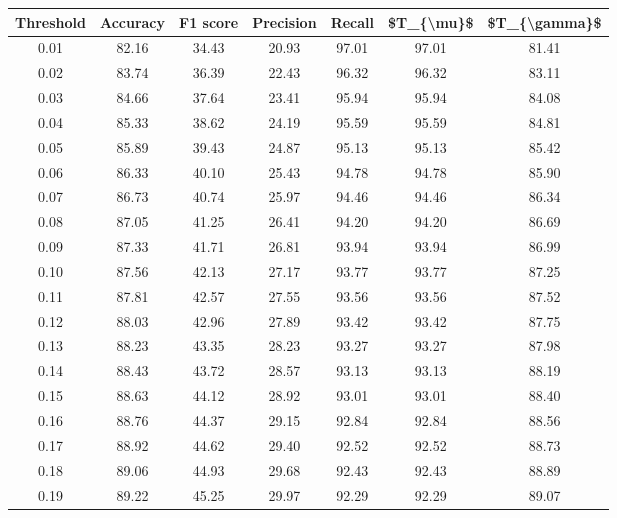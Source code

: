 \begin{tabular}{|c|c|c|c|c|c|c|}
\hline
 Threshold &  Accuracy &  F1 score &  Precision &  Recall &  \$T\_\{\textbackslash mu\}\$ &  \$T\_\{\textbackslash gamma\}\$ \\
\hline
      0.01 &     82.16 &     34.43 &      20.93 &   97.01 &      97.01 &         81.41 \\
      0.02 &     83.74 &     36.39 &      22.43 &   96.32 &      96.32 &         83.11 \\
      0.03 &     84.66 &     37.64 &      23.41 &   95.94 &      95.94 &         84.08 \\
      0.04 &     85.33 &     38.62 &      24.19 &   95.59 &      95.59 &         84.81 \\
      0.05 &     85.89 &     39.43 &      24.87 &   95.13 &      95.13 &         85.42 \\
      0.06 &     86.33 &     40.10 &      25.43 &   94.78 &      94.78 &         85.90 \\
      0.07 &     86.73 &     40.74 &      25.97 &   94.46 &      94.46 &         86.34 \\
      0.08 &     87.05 &     41.25 &      26.41 &   94.20 &      94.20 &         86.69 \\
      0.09 &     87.33 &     41.71 &      26.81 &   93.94 &      93.94 &         86.99 \\
      0.10 &     87.56 &     42.13 &      27.17 &   93.77 &      93.77 &         87.25 \\
      0.11 &     87.81 &     42.57 &      27.55 &   93.56 &      93.56 &         87.52 \\
      0.12 &     88.03 &     42.96 &      27.89 &   93.42 &      93.42 &         87.75 \\
      0.13 &     88.23 &     43.35 &      28.23 &   93.27 &      93.27 &         87.98 \\
      0.14 &     88.43 &     43.72 &      28.57 &   93.13 &      93.13 &         88.19 \\
      0.15 &     88.63 &     44.12 &      28.92 &   93.01 &      93.01 &         88.40 \\
      0.16 &     88.76 &     44.37 &      29.15 &   92.84 &      92.84 &         88.56 \\
      0.17 &     88.92 &     44.62 &      29.40 &   92.52 &      92.52 &         88.73 \\
      0.18 &     89.06 &     44.93 &      29.68 &   92.43 &      92.43 &         88.89 \\
      0.19 &     89.22 &     45.25 &      29.97 &   92.29 &      92.29 &         89.07 \\

\end{tabular}

